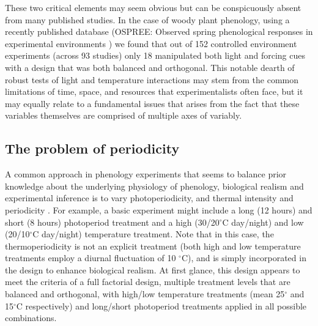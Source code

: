 \documentclass[11pt]{article}
\begin{document}
These two critical elements may seem obvious but can be conspicuously absent from many published studies. In the case of woody plant phenology, using a recently published database (OSPREE: Observed spring phenological responses in experimental environments \citep{wolkovich2019}) we found that out of 152 controlled environment experiments (across 93 studies) only 18 manipulated both light and forcing cues with a design that was both balanced and orthogonal. This notable dearth of robust tests of light and temperature interactions may stem from the common limitations of time, space, and resources that experimentalists often face, but it may equally relate to a fundamental issues that arises from the fact that these variables themselves are comprised of multiple axes of variably.\\

\subsection*{The problem of periodicity}
A common approach in phenology experiments that seems to balance prior knowledge about the underlying physiology of phenology, biological realism and experimental inference is to vary photoperiodicity, and thermal intensity and periodicity \citep[e.g.][]{Flynn2018,Sanz-Perez:2009aa,Basler:2014aa}. For example, a basic experiment might include a long (12 hours) and short (8 hours) photoperiod treatment and a high (30/20$^{\circ}$C day/night) and low (20/10$^{\circ}$C day/night) temperature treatment. Note that in this case, the thermoperiodicity is not an explicit treatment (both high and low temperature treatments employ a diurnal fluctuation of 10 $^{\circ}$C), and is simply incorporated in the design to enhance biological realism. At first glance, this design appears to meet the criteria of a full factorial design, multiple treatment levels that are balanced and orthogonal, with high/low temperature treatments (mean 25$^{\circ}$ and 15$^{\circ}$C respectively) and long/short photoperiod treatments applied in all possible combinations.
\end{document}
